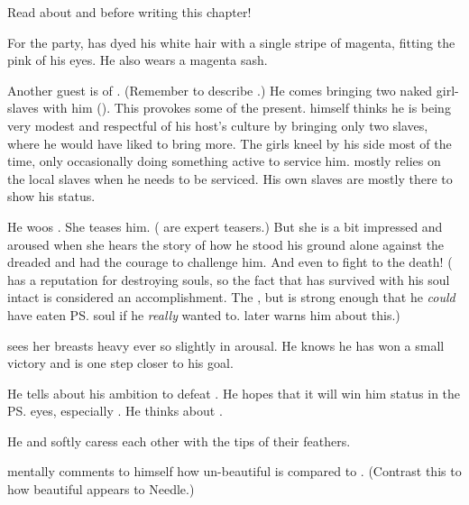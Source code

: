 Read about  and  before writing this chapter!

For the party, \Teshrial{} has dyed his white hair with a single stripe of magenta, fitting the pink of his eyes. 
He also wears a magenta sash. 

Another guest is  of \Mystraacht. 
(Remember to describe .) 
He comes bringing two naked girl-slaves with him (). 
This provokes some of the \CiriathSepher{} present. 
\Dezruth{} himself thinks he is being very modest and respectful of his host's culture by bringing only two slaves, where he would have liked to bring more. 
The girls kneel by his side most of the time, only occasionally doing something active to service him. 
\Dezruth{} mostly relies on the local slaves when he needs to be serviced. 
His own slaves are mostly there to show his status. 

He woos \Firaxel. 
She teases him. 
(\Resviel{} are expert teasers.)
But she is a bit impressed and aroused when she hears the story of how he stood his ground alone against the dreaded \Ishnaruchaefir{} and had the courage to challenge him. 
And even to fight to the death! 
(\Ishnaruchaefir{} has a reputation for destroying souls, so the fact that \Teshrial{} has survived with his soul intact is considered an accomplishment.
The , but \Ishnaruchaefir{} is strong enough that he \emph{could} have eaten \ps{\Teshrial} soul if he \emph{really} wanted to.
\Menessiaraid{} later warns him about this.)

\Teshrial{} sees her breasts heavy ever so slightly in arousal. 
He knows he has won a small victory and is one step closer to his goal. 

He tells about his ambition to defeat . 
He hopes that it will win him status in the \ps{\resviel}{} eyes, especially \Firaxel. 
He thinks about . 


He and \Firaxel{} softly caress each other with the tips of their feathers. 

\Teshrial{} mentally comments to himself how un-beautiful \Achsah{} is compared to \Firaxel. 
(Contrast this to how beautiful \Achsah{} appears to Needle.) 

